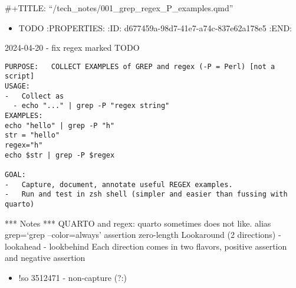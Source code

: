 \documentclass[
  letterpaper,
  DIV=11,
  numbers=noendperiod]{scrartcl}
\author{jim}
\date{2023-12-20}
\providecommand{\tightlist}{%
  \setlength{\itemsep}{0pt}\setlength{\parskip}{0pt}}\usepackage{longtable,booktabs,array}
\begin{document}
\#+TITLE: ``/tech\_notes/001\_grep\_regex\_P\_examples.qmd''

\begin{itemize}
\tightlist
\item
  TODO :PROPERTIES: :ID: d677459a-98d7-41e7-a74c-837e62a178e5 :END:
\end{itemize}

2024-04-20 - fix regex marked TODO

\begin{verbatim}
PURPOSE:   COLLECT EXAMPLES of GREP and regex (-P = Perl) [not a script]
USAGE:      
-   Collect as
  - echo "..." | grep -P "regex string"
EXAMPLES:   
echo "hello" | grep -P "h"
str = "hello"
regex="h"
echo $str | grep -P $regex

GOAL:  
-   Capture, document, annotate useful REGEX examples.
-   Run and test in zsh shell (simpler and easier than fussing with quarto)
\end{verbatim}

*** Notes *** QUARTO and regex: quarto sometimes does not like. alias
grep=`grep --color=always' assertion zero-length Lookaround (2
directions) - lookahead - lookbehind Each direction comes in two
flavors, positive assertion and negative assertion

\begin{itemize}
\tightlist
\item
  !so 3512471 - non-capture (?:)
\end{itemize}
\end{document}
